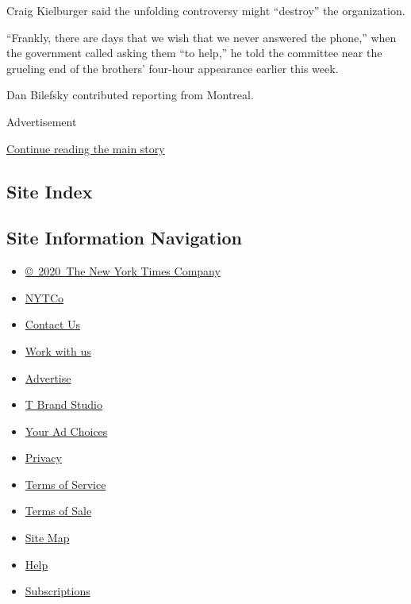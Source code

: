 Craig Kielburger said the unfolding controversy might ``destroy'' the
organization.

``Frankly, there are days that we wish that we never answered the
phone,'' when the government called asking them ``to help,'' he told the
committee near the grueling end of the brothers' four-hour appearance
earlier this week.

Dan Bilefsky contributed reporting from Montreal.

Advertisement

\protect\hyperlink{after-bottom}{Continue reading the main story}

\hypertarget{site-index}{%
\subsection{Site Index}\label{site-index}}

\hypertarget{site-information-navigation}{%
\subsection{Site Information
Navigation}\label{site-information-navigation}}

\begin{itemize}
\tightlist
\item
  \href{https://help.nytimes3xbfgragh.onion/hc/en-us/articles/115014792127-Copyright-notice}{©~2020~The
  New York Times Company}
\end{itemize}

\begin{itemize}
\tightlist
\item
  \href{https://www.nytco.com/}{NYTCo}
\item
  \href{https://help.nytimes3xbfgragh.onion/hc/en-us/articles/115015385887-Contact-Us}{Contact
  Us}
\item
  \href{https://www.nytco.com/careers/}{Work with us}
\item
  \href{https://nytmediakit.com/}{Advertise}
\item
  \href{http://www.tbrandstudio.com/}{T Brand Studio}
\item
  \href{https://www.nytimes3xbfgragh.onion/privacy/cookie-policy\#how-do-i-manage-trackers}{Your
  Ad Choices}
\item
  \href{https://www.nytimes3xbfgragh.onion/privacy}{Privacy}
\item
  \href{https://help.nytimes3xbfgragh.onion/hc/en-us/articles/115014893428-Terms-of-service}{Terms
  of Service}
\item
  \href{https://help.nytimes3xbfgragh.onion/hc/en-us/articles/115014893968-Terms-of-sale}{Terms
  of Sale}
\item
  \href{https://spiderbites.nytimes3xbfgragh.onion}{Site Map}
\item
  \href{https://help.nytimes3xbfgragh.onion/hc/en-us}{Help}
\item
  \href{https://www.nytimes3xbfgragh.onion/subscription?campaignId=37WXW}{Subscriptions}
\end{itemize}
